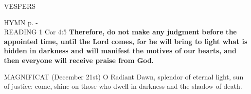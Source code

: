 \begin{flushleft}\normalsize{\uppercase{Vespers\\}}\end{flushleft}
\small{\uppercase{Hymn} p. \pageref{advent:firstHymn}-\pageref{advent:lastHymn}\\}
\noindent\small{\uppercase{Reading}} 1 Cor 4:5 \textbf{ Therefore, do not make any judgment before the appointed time, until the Lord comes, for he will bring to light what is hidden in darkness and will manifest the motives of our hearts, and then everyone will receive praise from God.\\}

\noindent\small{\uppercase{Magnificat}} (December 21st)
O Radiant Dawn, splendor of eternal light, sun of justice: come, shine on those who dwell in darkness and the shadow of death.
